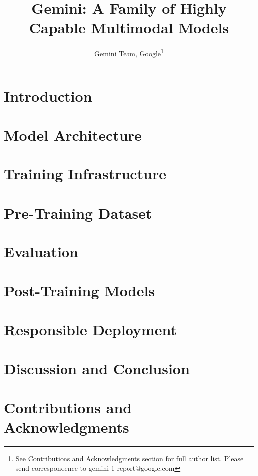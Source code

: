 \documentclass[11pt, letterpaper, logo, onecolumn, copyright, numbering]{googledeepmind}
\title{Gemini: A Family of Highly Capable Multimodal Models}
\author[*,1]{Gemini Team, Google\footnote{See Contributions and Acknowledgments section for full author list. Please send correspondence to gemini-1-report@google.com}}
\begin{document}
\maketitle

\section{Introduction}
\label{sec:intro}

\section{Model Architecture}
\label{sec:arch}

\section{Training Infrastructure}
\label{sec:infra}

\section{Pre-Training Dataset}
\label{sec:data}



\section{Evaluation}
\label{sec:eval}




\clearpage

\section{Post-Training Models}





\section{Responsible Deployment}
\label{sec:responsible-deployment}

\section{Discussion and Conclusion}
\label{discussion}

\newpage


\section{Contributions and Acknowledgments}
\label{sec:contributions}

\pagebreak
\end{document}
